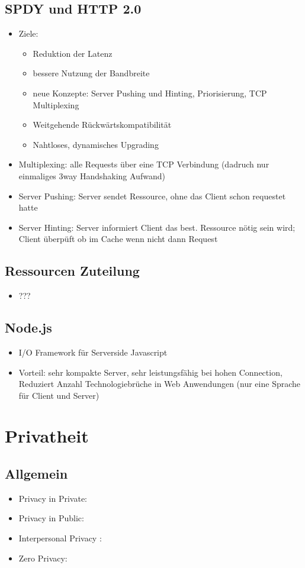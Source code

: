 \documentclass{article} %
\begin{document}
	\subsection{SPDY und HTTP 2.0}
	\begin{itemize}
		\item Ziele:
		\begin{itemize}
			\item Reduktion der Latenz
			\item bessere Nutzung der Bandbreite
			\item neue Konzepte: Server Pushing und Hinting, Priorisierung, TCP Multiplexing
			\item Weitgehende Rückwärtskompatibilität
			\item Nahtloses, dynamisches Upgrading
		\end{itemize}
		\item Multiplexing: alle Requests über eine TCP Verbindung (dadruch nur einmaliges 3way Handshaking Aufwand)
		\item Server Pushing: Server sendet Ressource, ohne das Client schon requestet hatte
		\item Server Hinting: Server informiert Client das best. Ressource nötig sein wird; Client überpüft ob im Cache wenn nicht dann Request
	\end{itemize}
	\subsection{Ressourcen Zuteilung}
	\begin{itemize}
		\item ???
	\end{itemize}
	\subsection{Node.js}
	\begin{itemize}
		\item I/O Framework für Serverside Javascript
		\item Vorteil: sehr kompakte Server, sehr leistungsfähig bei hohen Connection, Reduziert Anzahl Technologiebrüche in Web Anwendungen (nur eine Sprache für Client und Server)
	\end{itemize}
\section{Privatheit}
	\subsection{Allgemein}
	\begin{itemize}
		\item \glqq Privacy in Private\grqq:
		\item \glqq Privacy in Public\grqq:
		\item \glqq Interpersonal Privacy \grqq:
		\item \glqq Zero Privacy\grqq:
	\end{itemize}
\end{document}
